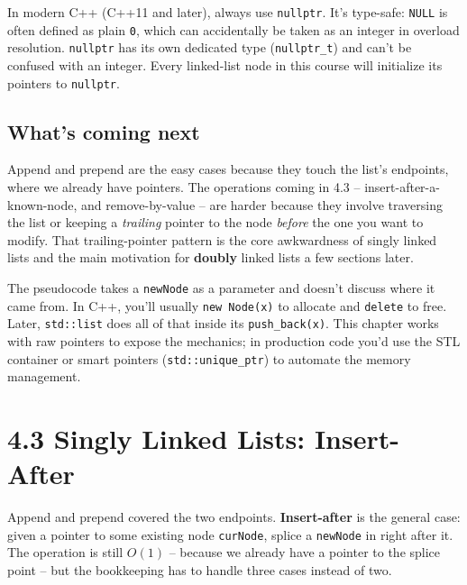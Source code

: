 \documentclass[11pt]{article}
\begin{document}
\begin{warnbox}
In modern C++ (C++11 and later), always use \texttt{nullptr}. It's
type-safe: \texttt{NULL} is often defined as plain \texttt{0}, which
can accidentally be taken as an integer in overload resolution.
\texttt{nullptr} has its own dedicated type (\texttt{nullptr\_t}) and
can't be confused with an integer. Every linked-list node in this
course will initialize its pointers to \texttt{nullptr}.
\end{warnbox}

\subsection{What's coming next}

\begin{ideabox}
Append and prepend are the easy cases because they touch the list's
endpoints, where we already have pointers. The operations coming in
4.3 -- insert-after-a-known-node, and remove-by-value -- are harder
because they involve traversing the list or keeping a \emph{trailing}
pointer to the node \emph{before} the one you want to modify. That
trailing-pointer pattern is the core awkwardness of singly linked
lists and the main motivation for \textbf{doubly} linked lists a
few sections later.
\end{ideabox}

\begin{notebox}
The pseudocode takes a \texttt{newNode} as a parameter and doesn't
discuss where it came from. In C++, you'll usually \texttt{new Node(x)}
to allocate and \texttt{delete} to free. Later, \texttt{std::list}
does all of that inside its \texttt{push\_back(x)}. This chapter
works with raw pointers to expose the mechanics; in production code
you'd use the STL container or smart pointers (\texttt{std::unique\_ptr})
to automate the memory management.
\end{notebox}

\section{4.3 Singly Linked Lists: Insert-After}

Append and prepend covered the two endpoints. \textbf{Insert-after}
is the general case: given a pointer to some existing node
\texttt{curNode}, splice a \texttt{newNode} in right after it. The
operation is still $O(1)$ -- because we already have a pointer to
the splice point -- but the bookkeeping has to handle three cases
instead of two.
\end{document}
